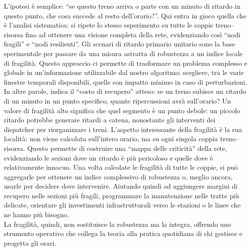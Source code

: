 \documentclass{report}
\begin{document}
L’ipotesi è semplice: “se questo treno arriva o parte con un minuto di ritardo in questo punto, che cosa succede al resto dell’orario?”.
Qui entra in gioco quella che è l'analisi sistematica: si ripete lo stesso esperimento su tutte le coppie treno–risorsa fino ad ottenere una visione completa della rete, evidenziando così “nodi fragili” e “nodi resilienti”.
Gli scenari di ritardo primario unitario sono la base sperimentale per passare da una misura astratta di robustezza a un indice locale di fragilità. Questo approccio ci permette di trasformare un problema complesso e globale in un’informazione utilizzabile dal nostro algoritmo: scegliere, tra le varie finestre temporali disponibili, quelle con impatto minimo in caso di perturbazioni. \\ In altre parole, indica il “costo di recupero” atteso: se un treno subisce un ritardo di un minuto in un punto specifico, quante ripercussioni avrà sull’orario? Un valore di fragilità alto significa che quel segmento è un punto debole: un piccolo ritardo potrebbe generare ritardi a catena, nonostante gli interventi dei dispatcher per riorganizzare i treni.
    L’aspetto interessante della fragilità è la sua località: non viene calcolata sull’intero orario, ma su ogni singola coppia treno–risorsa. Questo permette di costruire una “mappa delle criticità” della rete, evidenziando le sezioni dove un ritardo è più pericoloso e quelle dove è relativamente innocuo. Una volta calcolate le fragilità di tutte le coppie, si può aggregarle per ottenere un indice complessivo di robustezza o, meglio ancora, usarle per decidere dove intervenire. Aiutando quindi ad aggiungere margini di recupero nelle sezioni più fragili, programmare la manutenzione nelle tratte più delicate, orientare gli investimenti infrastrutturali verso le stazioni o le linee che ne hanno più bisogno. \\ La fragilità, quindi, non sostituisce la robustezza ma la integra, offrendo uno strumento operativo che collega la teoria alla pratica quotidiana di chi gestisce e progetta gli orari.
\end{document}
